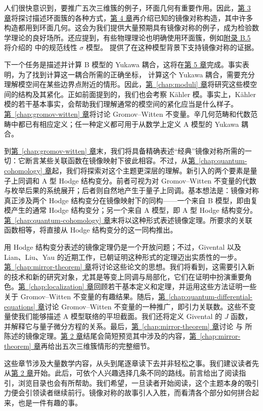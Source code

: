 人们很快意识到，要推广五次三维簇的例子，环面几何有重要作用。因此，\hyperref[chap:toric]{第 3 章}将探讨描述环面簇的各种方式，\hyperref[chap:mirror-constructions]{第 4 章}再介绍已知的镜像对称构造，其中许多构造都用到环面几何。这会为我们提供大量预期具有镜像对称的例子，成为检验数学理论的良好场所。还应提到，有些物理理论也明确使用环面簇，例如\hyperref[sec:gauged-linear-sigma-models]{附录 B.5} 将介绍的  中的规范线性 $\sigma$ 模型。 提供了在这种模型背景下支持镜像对称的证据。

下一个任务是描述并计算 B 模型的 Yukawa 耦合，这将在\hyperref[chap:hodge-yukawa]{第 5 章}完成。事实表明，为了找到计算这一耦合所需的正确坐标，
计算这个 Yukawa 耦合，需要充分理解模空间在某些边界点附近的情形。因此，\hyperref[chap:moduli]{第~\ref*{chap:moduli} 章}将研究这些模空间的结构及其紧化。正如前面提到的，我们也会考察 Kähler 模。事实上，Kähler 模的若干基本事实，会帮助我们理解通常的模空间的紧化应当是什么样子。\hyperref[chap:gromov-witten]{第~\ref*{chap:gromov-witten} 章}将讨论 Gromov--Witten 不变量。辛几何范畴和代数范畴中都已有相应定义；任一种定义都可用于从数学上定义 A 模型的 Yukawa 耦合。

到\hyperref[chap:gromov-witten]{第~\ref*{chap:gromov-witten} 章}末，我们将具备精确表述“经典”镜像对称所需的一切：它断言某些关联函数在镜像映射下彼此相容。不过，从\hyperref[chap:quantum-cohomology]{第~\ref*{chap:quantum-cohomology} 章}起，我们将探索对这个主题更深层的理解。新引入的两个要素是量子上同调和 A 型 Hodge 结构变分。前者可视为对 Gromov--Witten 不变量的代数与枚举后果的系统展开；后者则自然地产生于量子上同调。基本想法是：镜像对称真正涉及两个 Hodge 结构变分在镜像映射下的同构——一个来自 B 模型，即由复模产生的通常 Hodge 结构变分；另一个来自 A 模型，即 A 型 Hodge 结构变分。\hyperref[chap:quantum-cohomology]{第~\ref*{chap:quantum-cohomology} 章}末将以这种形式表述镜像定理。所要求的关联函数相等，将直接从 Hodge 结构变分的这一同构推出。

用 Hodge 结构变分表述的镜像定理仍是一个开放问题；不过，Givental  以及 Lian、Liu、Yau  的近期工作，已朝证明这种形式的定理迈出实质性的一步。\hyperref[chap:mirror-theorem]{第~\ref*{chap:mirror-theorem} 章}将讨论这些论文的思想。我们将看到，这需要引入新的技术和新的研究对象，尤其是等变上同调与局部化，它们在证明中扮演重要角色。\hyperref[chap:localization]{第~\ref*{chap:localization} 章}回顾若干基本定义和定理，并运用这些方法证明一些关于 Gromov--Witten 不变量的有趣结果。随后，\hyperref[chap:quantum-differential-equations]{第~\ref*{chap:quantum-differential-equations} 章}讨论 Gromov--Witten 不变量的一种推广，即引力关联数。这些不变量使我们能够描述 A 模型联络的平坦截面。我们还将定义 Givental 的 $J$ 函数，并解释它与量子微分方程的关系。最后，\hyperref[chap:mirror-theorem]{第~\ref*{chap:mirror-theorem} 章}讨论  与  所陈述的镜像定理。\hyperref[chap:quintic]{第 2 章}结尾会简短预览其中涉及的内容，\hyperref[chap:mirror-theorem]{第~\ref*{chap:mirror-theorem} 章}再给出五次三维簇情形的完整细节。

这些章节涉及大量数学内容，从头到尾逐章读下去并非轻松之事。我们建议读者先从\hyperref[chap:quintic]{第 2 章}开始。此后，可依个人兴趣选择几条不同的路线。前言给出了阅读指引，浏览目录也会有所帮助。我们希望，一旦读者开始阅读，这个主题本身的吸引力便会引领读者继续前行。镜像对称的故事引人入胜，而看清各个部分如何拼合起来，也是一件有趣的事。

\par\endgroup
